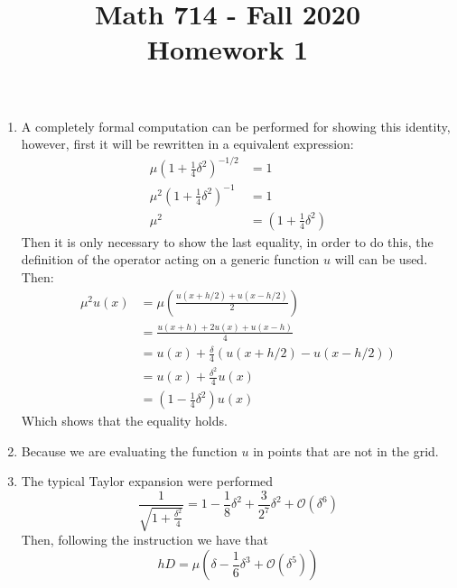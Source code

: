 \documentclass{article}
\title{Math 714 - Fall 2020\\
        {\Large \textbf{Homework 1}}
    }
\date{}
\numberwithin{equation}{section}
\begin{document}
    \maketitle
    \section{}
    \begin{enumerate}[label=(\alph*)]
        \item A completely formal computation can be performed for showing this identity, however, first it will be rewritten in a equivalent expression:
        \begin{align*}
            \mu\left(1+\frac{1}{4}\delta^2\right)^{-1/2} &= 1\\
            \mu^2\left(1+\frac{1}{4}\delta^2\right)^{-1}&=1\\
            \mu^2 &= \left(1+\frac{1}{4}\delta^2\right)
        \end{align*}
        Then it is only necessary to show the last equality, in order to do this, the definition of the operator acting on a generic function $u$ will can be used.\\
        Then:
        \begin{align*}
            \mu^2 u(x)
                & = \mu\left(\frac{u(x+h/2)+u(x-h/2)}{2}\right)\\
                & = \frac{u(x+h)+2u(x)+u(x-h)}{4}\\
                & = u(x) + \frac{\delta}{4}(u(x+h/2)-u(x-h/2))\\
                & = u(x) + \frac{\delta^2}{4}u(x)\\
                & = \left(1-\frac{1}{4}\delta^2\right)u(x)
        \end{align*}
        Which shows that the equality holds.

        \item Because we are evaluating the function $u$ in points that are not in the grid.
        \item The typical Taylor expansion were performed
            $$\frac{1}{\sqrt{1+\frac{\delta^2}{4}}} = 1-\frac{1}{8}\delta^2 + \frac{3}{2^7}\delta^2 + \mathcal{O}(\delta^6)$$
        Then, following the instruction we have that
            $$hD = \mu\left(\delta - \frac{1}{6}\delta^3 + \mathcal{O}(\delta^5)\right)$$
    \end{enumerate}
\end{document}
